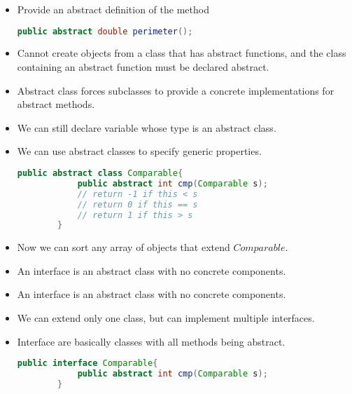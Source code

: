 \documentclass[a4paper]{article}
\begin{document}
\begin{itemize}
    \item Provide an abstract definition of the method
    \begin{lstlisting}[language=Java]
        public abstract double perimeter();
    \end{lstlisting}
    \item Cannot create objects from a class that has abstract functions, and the class containing an abstract function must be declared abstract.
    \item Abstract class forces subclasses to provide a concrete implementations for abstract methods.
    \item We can still declare variable whose type is an abstract class.
    \item We can use abstract classes to specify generic properties.
    \begin{lstlisting}[language=Java]
        public abstract class Comparable{
            public abstract int cmp(Comparable s);
            // return -1 if this < s
            // return 0 if this == s
            // return 1 if this > s
        }
    \end{lstlisting}
    \item Now we can sort any array of objects that extend $Comparable$.
    \item An interface is an abstract class with no concrete components.
    \item An interface is an abstract class with no concrete components.
    \item We can extend only one class, but can implement multiple interfaces.
    \item Interface are basically classes with all methods being abstract.
    \begin{lstlisting}[language=Java]
        public interface Comparable{
            public abstract int cmp(Comparable s);
        }


\end{lstlisting}
\end{itemize}
\end{document}
